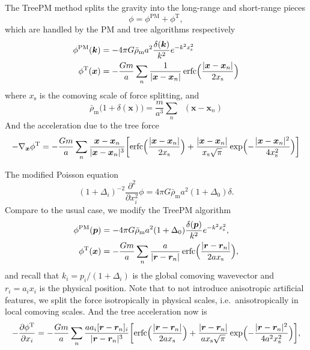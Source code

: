 \documentclass[a4paper,11pt]{article}
\DeclareMathOperator{\deltaD}{\delta^\mathrm{D}}
\DeclareMathOperator{\erfc}{erfc}
\newcommand{\vr}{{\bm r}}
\newcommand{\vx}{{\bm x}}
\newcommand{\vk}{{\bm k}}
\newcommand{\vp}{{\bm p}}
\newcommand{\rhobarm}{{\bar\rho_\mathrm{m}}}
\newcommand{\Tree}{\mathrm{T}}
\newcommand{\PM}{\mathrm{PM}}
\newcommand{\xs}{x_\mathrm{s}}
\begin{document}
The TreePM method splits the gravity into the long-range and short-range pieces
\begin{equation}
    \phi = \phi^\PM + \phi^\Tree,
\end{equation}
which are handled by the PM and tree algorithms respectively \cite{Bagla02,
BaglaRay03}
\begin{align}
    \phi^\PM(\vk) &= - 4\pi G \rhobarm a^2
        \frac{\delta(\vk)}{k^2} e^{- k^2 \xs^2} \\
    \phi^\Tree(\vx) &= - \frac{G m}a \sum_n \frac1{|\vx-\vx_n|}
    \erfc \Bigl( \frac{|\vx-\vx_n|}{2 \xs} \Bigr)
\end{align}
where $\xs$ is the comoving scale of force splitting,
and
\begin{equation}
    \rhobarm \bigl( 1 + \delta(\vx) \bigr)
    = \frac{m}{a^3} \sum_n \deltaD(\vx-\vx_n)
\end{equation}
And the acceleration due to the tree force
\begin{equation}
    - \nabla_\vx \phi^\Tree = - \frac{G m}a \sum_n
    \frac{\vx - \vx_n}{|\vx - \vx_n|^3}
    \biggl[ \erfc \Bigl( \frac{|\vx - \vx_n|}{2 \xs} \Bigr)
            + \frac{|\vx - \vx_n|}{\xs \sqrt\pi}
            \exp \Bigl( - \frac{|\vx - \vx_n|^2}{4 \xs^2} \Bigr) \biggr]
\end{equation}

The modified Poisson equation
\begin{equation}
    (1+\Delta_i)^{-2} \frac{\partial^2}{\partial x_i^2} \phi
    = 4\pi G \rhobarm a^2 (1 + \Delta_0) \delta.
\end{equation}
Compare to the usual case, we modify the TreePM algorithm
\begin{align}
    \phi^\PM(\vp) &= - 4\pi G \rhobarm a^2 (1 + \Delta_0)
        \frac{\delta(\vp)}{k^2} e^{- k^2 \xs^2}, \\
    \phi^\Tree(\vx) &= - \frac{G m}a \sum_n \frac{a}{|\vr - \vr_n|}
    \erfc \Bigl( \frac{|\vr - \vr_n|}{2 a \xs} \Bigr),
\end{align}
and recall that $k_i = p_i / (1 + \Delta_i)$ is the global comoving wavevector
and $r_i = a_i x_i$ is the physical position.
Note that to not introduce anisotropic artificial features, we split the force
isotropically in physical scales, i.e.\ anisotropically in local comoving
scales.
And the tree acceleration now is
\begin{equation}
    - \frac{\partial\phi^\Tree}{\partial x_i} = - \frac{G m}a \sum_n
    \frac{a a_i [\vr - \vr_n]_i}{|\vr - \vr_n|^3}
    \biggl[ \erfc \Bigl( \frac{|\vr - \vr_n|}{2 a \xs} \Bigr)
            + \frac{|\vr - \vr_n|}{a \xs \sqrt\pi}
            \exp \Bigl( - \frac{|\vr - \vr_n|^2}{4 a^2 \xs^2} \Bigr) \biggr],
\end{equation}
\end{document}

